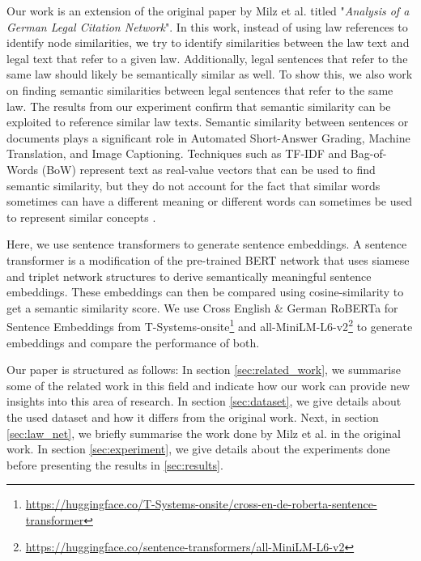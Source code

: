 \documentclass[runningheads]{llncs}
\begin{document}
Our work is an extension of the original paper by Milz et al.\cite{milz2021analysis} titled "\textit{Analysis of a German Legal Citation Network}". In this work, instead of using law references to identify node similarities, we try to identify similarities between the law text and legal text that refer to a given law. Additionally, legal sentences that refer to the same law should likely be semantically similar as well. To show this, we also work on finding semantic similarities between legal sentences that refer to the same law. The results from our experiment confirm that semantic similarity can be exploited to reference similar law texts. Semantic similarity between sentences or documents plays a significant role in Automated Short-Answer Grading, Machine Translation, and Image Captioning\cite{sanborn2015deep}. Techniques such as TF-IDF and Bag-of-Words (BoW) represent text as real-value vectors that can be used to find semantic similarity, but they do not account for the fact that similar words sometimes can have a different meaning or different words can sometimes be used to represent similar concepts \cite{chandrasekaran2021evolution}.

Here, we use sentence transformers to generate sentence embeddings. A sentence transformer is a modification of the pre-trained BERT network that uses siamese and triplet network structures to derive semantically meaningful sentence embeddings\cite{reimers2019sentence}. These embeddings can then be compared using cosine-similarity to get a semantic similarity score. We use Cross English \& German RoBERTa for Sentence Embeddings from T-Systems-onsite\footnote{\url{https://huggingface.co/T-Systems-onsite/cross-en-de-roberta-sentence-transformer}} and all-MiniLM-L6-v2\footnote{\url{https://huggingface.co/sentence-transformers/all-MiniLM-L6-v2}} to generate embeddings and compare the performance of both.

Our paper is structured as follows: In section \ref{sec:related_work}, we summarise some of the related work in this field and indicate how our work can provide new insights into this area of research. In section \ref{sec:dataset}, we give details about the used dataset and how it differs from the original work. Next, in section \ref{sec:law_net}, we briefly summarise the work done by Milz et al. in the original work. In section \ref{sec:experiment}, we give details about the experiments done before presenting the results in \ref{sec:results}.

\end{document}
